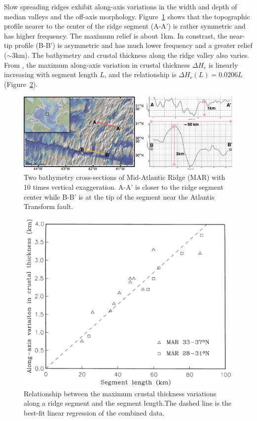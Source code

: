 \documentclass[12pt]{article}
\begin{document}
Slow spreading ridges exhibit along-axis variations in the width and depth of median valleys and the off-axis morphology.  Figure~\ref{fig2_1} shows that the topographic profile nearer to the center of the ridge segment (A-A') is rather symmetric and has higher frequency. The maximum relief is about 1km. In constrast, the near-tip profile (B-B') is asymmetric and has much lower frequency and a greater relief ($\sim$3km). The bathymetry and crustal thickness along the ridge valley also varies. From \citep{Chen1999}, the maximum along-axis variation in crustal thickness $\Delta H_{c}$ is linearly increasing with segment length $L$, and the relationship is $\Delta H_{c}(L)=0.0206L$ (Figure~\ref{fig3_1}).

\begin{figure}[H]
 \centering
  \includegraphics[scale=0.4]{fig2_1.png}
 \caption{\small{Two bathymetry cross-sections of Mid-Atlantic Ridge (MAR) with 10 times vertical exaggeration. A-A' is closer to the ridge segment center while B-B' is at the tip of the segment near the Atlantis Transform fault.}}
 \label{fig2_1}
\end{figure}

\begin{figure}[H]
 \centering
  \includegraphics[scale=0.3]{fig3_1.png}
 \caption{\small{Relationship between the maximum crustal thickness variations along a ridge segment and the segment length.The dashed line is the best-fit linear regression of the combined data. \citep{Chen1999}}}
 \label{fig3_1}
\end{figure}
\end{document}
